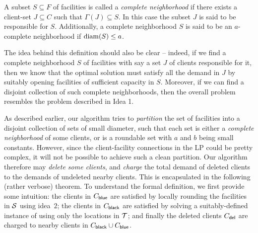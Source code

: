 \begin{definition} \label{def:comp-nbr}
	A subset $S\subseteq F$ of facilities is called a {\em complete neighborhood} if there exists a client-set $J\subseteq C$ such that $\Gamma(J) \subseteq S$.
	In this case the subset $J$ is said to be responsible for $S$. Additionally, a complete neighborhood $S$ is said to be an $a$-complete neighborhood if $\mathrm{diam}(S) \leq a$.
\end{definition}
The idea behind this definition should also be clear -- indeed, if we find a complete neighborhood $S$ of facilities with say a set $J$ of clients responsible for it, then we know that the optimal solution must satisfy all the demand in $J$ by suitably opening facilities of sufficient capacity in $S$. Moreover, if we can find a disjoint collection of such complete neighborhoods, then the overall problem resembles the \cckp problem described in Idea 1.

\medskip \noindent
As described earlier, our algorithm tries to \emph{partition} the set of facilities into a disjoint collection of sets of small diameter, such that each set is either a \emph{complete neighborhood} of some clients, or is a roundable set with $a$ and $b$ being small constants.
However, since the client-facility connections in the LP could be pretty complex, it will not be possible to achieve such a clean partition. Our algorithm therefore may \emph{delete some clients}, and \emph{charge} the total demand of deleted clients to the demands of undeleted nearby clients.
This is encapsulated in the following (rather verbose) theorem. To understand the formal definition, we first provide some intuition: the clients in $C_{\mathsf{blue}}$ are satisfied by locally rounding the facilities in ${\cal S}$ using idea~$2$; the clients in $C_{\mathsf{black}}$ are satisfied by solving a suitably-defined instance of \cckp using only the locations in ${\cal T}$; and finally the deleted clients $C_{\mathsf{del}}$ are charged to nearby clients in $C_{\mathsf{black}} \cup C_{\mathsf{blue}}$.


